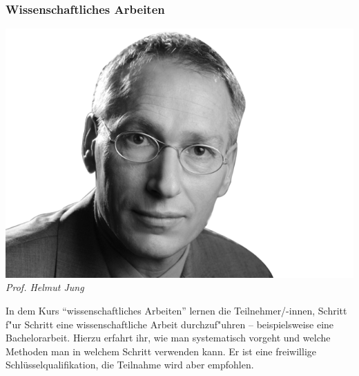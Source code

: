 \subsubsection{Wissenschaftliches Arbeiten}

\includegraphics[width=0.9\linewidth]{bilder/dozenten/jung_frei.png}\\
\textit{Prof. Helmut Jung}

In dem Kurs "`wissenschaftliches Arbeiten"' lernen die Teilnehmer/-innen, Schritt f"ur Schritt eine wissenschaftliche Arbeit durchzuf"uhren -- beispielsweise eine Bachelorarbeit.
Hierzu erfahrt ihr, wie man systematisch vorgeht und welche Methoden
man in welchem Schritt verwenden kann. Er ist eine freiwillige
Schlüsselqualifikation, die Teilnahme wird aber empfohlen.


